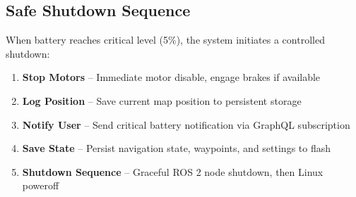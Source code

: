 \subsection{Safe Shutdown Sequence}

When battery reaches critical level (5\%), the system initiates a controlled shutdown:

\begin{enumerate}
    \item \textbf{Stop Motors} -- Immediate motor disable, engage brakes if available
    \item \textbf{Log Position} -- Save current map position to persistent storage
    \item \textbf{Notify User} -- Send critical battery notification via GraphQL subscription
    \item \textbf{Save State} -- Persist navigation state, waypoints, and settings to flash
    \item \textbf{Shutdown Sequence} -- Graceful ROS 2 node shutdown, then Linux poweroff
\end{enumerate}
